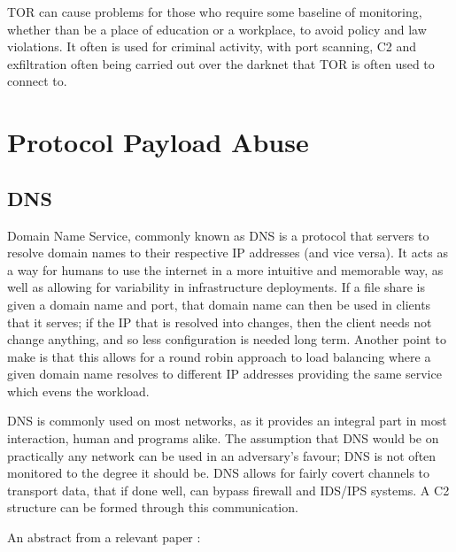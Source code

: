 TOR can cause problems for those who require some baseline of monitoring, whether than be a place of education or a workplace, to avoid policy and law violations. It often is used for criminal activity, with port scanning, 
C2 and exfiltration often being carried out over the darknet that TOR is often used to connect to. \citep{TorMalware}


\section{Protocol Payload Abuse}

\subsection{DNS}
Domain Name Service, commonly known as DNS is a protocol that servers to resolve domain names to their respective IP addresses (and vice versa). It acts as a way for humans to use the internet in a more intuitive and
memorable way, as well as allowing for variability in infrastructure deployments. If a file share is given a domain name and port, that domain name can then be used in clients that it serves; if the IP that is resolved into changes,
then the client needs not change anything, and so less configuration is needed long term. Another point to make is that this allows for a round robin approach to load balancing where a given domain name resolves to different IP addresses providing the
same service which evens the workload. 

DNS is commonly used on most networks, as it provides an integral part in most interaction, human and programs alike. The assumption that DNS would be on practically any network can be used in an adversary's favour; DNS is not often monitored to the degree it should be.
DNS allows for fairly covert channels to transport data, that if done well, can bypass firewall and IDS/IPS systems. A C2 structure can be formed through this communication.

An abstract from a relevant paper \citep{DNSExfiltration}: 

